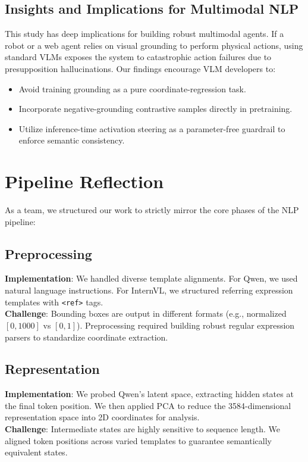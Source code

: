 \documentclass[12pt,a4paper]{article}
\begin{document}
\subsection{Insights and Implications for Multimodal NLP}
This study has deep implications for building robust multimodal agents. If a robot or a web agent relies on visual grounding to perform physical actions, using standard VLMs exposes the system to catastrophic action failures due to presupposition hallucinations. Our findings encourage VLM developers to:

\begin{itemize}[leftmargin=*]
\item Avoid training grounding as a pure coordinate-regression task.
\item Incorporate negative-grounding contrastive samples directly in pretraining.
\item Utilize inference-time activation steering as a parameter-free guardrail to enforce semantic consistency.
\end{itemize}

\section{Pipeline Reflection}

As a team, we structured our work to strictly mirror the core phases of the NLP pipeline:

\subsection{Preprocessing}
\textbf{Implementation}: We handled diverse template alignments. For Qwen, we used natural language instructions. For InternVL, we structured referring expression templates with \texttt{\textless ref\textgreater} tags.\\
\textbf{Challenge}: Bounding boxes are output in different formats (e.g., normalized $[0, 1000]$ vs $[0, 1]$). Preprocessing required building robust regular expression parsers to standardize coordinate extraction.

\subsection{Representation}
\textbf{Implementation}: We probed Qwen's latent space, extracting hidden states at the final token position. We then applied PCA to reduce the 3584-dimensional representation space into 2D coordinates for analysis.\\
\textbf{Challenge}: Intermediate states are highly sensitive to sequence length. We aligned token positions across varied templates to guarantee semantically equivalent states.
\end{document}
